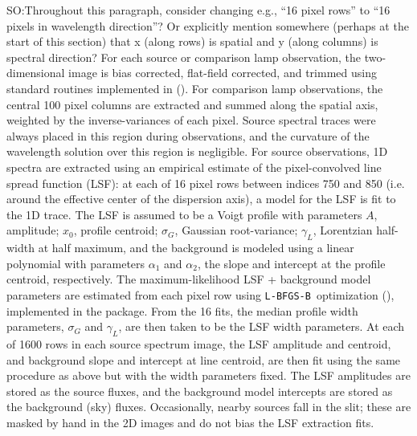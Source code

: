 \documentclass[modern, letterpaper]{aastex61}
\newcommand{\lbfgsb}{\texttt{L-BFGS-B}}
\newcommand{\smoh}[1]{\textcolor{mediumpersianblue}{SO:#1}}
\begin{document}
\smoh{Throughout this paragraph, consider changing e.g.,
  ``16 pixel rows'' to ``16 pixels in wavelength direction''?
  Or explicitly mention somewhere (perhaps at the start of this section)
  that x (along rows) is spatial and y (along columns) is spectral direction?}
For each source or comparison lamp observation, the two-dimensional image is
bias corrected, flat-field corrected, and trimmed using standard routines
implemented in  (\citealt{Craig:2015}).
For comparison lamp observations, the central 100 pixel columns are extracted
and summed along the spatial axis, weighted by the inverse-variances of each
pixel.
Source spectral traces were always placed in this region during observations,
and the curvature of the wavelength solution over this region is negligible.
For source observations, 1D spectra are extracted using an empirical
estimate of the pixel-convolved line spread function (LSF): at each of 16 pixel
rows between indices 750 and 850 (i.e. around the effective center of the
dispersion axis), a model for the LSF is fit to the 1D trace.
The LSF is assumed to be a Voigt profile with parameters $A$, amplitude; $x_0$,
profile centroid; $\sigma_G$, Gaussian root-variance; $\gamma_L$, Lorentzian
half-width at half maximum, and the background is modeled using a linear
polynomial with parameters $\alpha_1$ and $\alpha_2$, the slope and intercept
at the profile centroid, respectively.
The maximum-likelihood LSF + background model parameters are estimated from
each pixel row using \lbfgsb\ optimization (\citealt{Zhu:1994}), implemented in
the  package.
From the 16 fits, the median profile width parameters, $\sigma_G$ and
$\gamma_L$, are then taken to be the LSF width parameters.
At each of 1600 rows in each source spectrum image, the LSF amplitude and
centroid, and background slope and intercept at line centroid, are then fit
using the same procedure as above but with the width parameters fixed.
The LSF amplitudes are stored as the source fluxes, and the background model
intercepts are stored as the background (sky) fluxes.
Occasionally, nearby sources fall in the slit; these are masked by hand in the
2D images and do not bias the LSF extraction fits.
\end{document}
